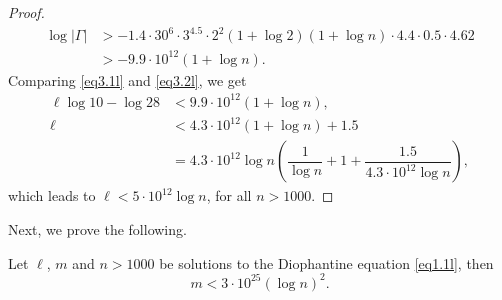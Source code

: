 \begin{proof}
\begin{align}\label{eq3.2l}
	\log |\Gamma| &> -1.4\cdot 30^{6} \cdot 3^{4.5}\cdot 2^2 (1+\log 2)(1+\log n)\cdot 4.4\cdot 0.5\cdot 4.62\nonumber\\
	&> -9.9\cdot 10^{12}(1+\log n).
\end{align}
Comparing \eqref{eq3.1l} and \eqref{eq3.2l}, we get
\begin{align*}
	\ell\log 10-\log 28&<9.9\cdot 10^{12}(1+\log n),\\
	\ell&<4.3\cdot 10^{12}(1+\log n)+1.5\\
	&=4.3\cdot 10^{12}\log n\left(\dfrac{1}{\log n}+1+\dfrac{1.5}{4.3\cdot 10^{12}\log n}\right),
\end{align*}
which leads to $\ell<5\cdot 10^{12}\log n$, for all $n>1000$.	
\end{proof}
Next, we prove the following.

\begin{lemma}\label{lem3.2l}
	Let $\ell$, $m$ and $n>1000$ be solutions to the Diophantine equation \eqref{eq1.1l}, then
	$$m<3\cdot 10^{25}(\log n)^2.$$
\end{lemma}
        
